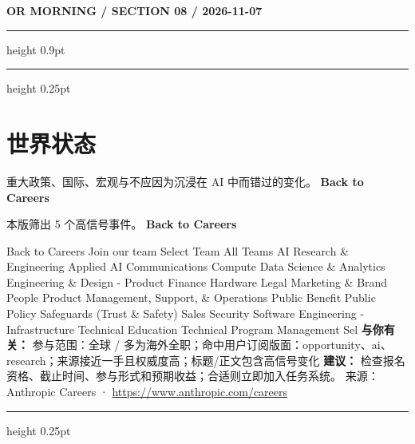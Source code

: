 \documentclass[10.5pt]{ctexart}
\begin{document}
\newpage
{\small\bfseries OR MORNING / SECTION 08 / 2026-11-07}
\vspace{2mm}
\hrule height 0.9pt
\vspace{1.5mm}
\hrule height 0.25pt
\vspace{4mm}
\section*{世界状态}
{\color{ormuted} 重大政策、国际、宏观与不应因为沉浸在 AI 中而错过的变化。}
\vspace{2mm}
{\LARGE\bfseries Back to Careers}\par
\vspace{1mm}
{\color{ormuted} 本版筛出 5 个高信号事件。}
\vspace{3mm}
{\Large\bfseries Back to Careers}\par
Back to Careers Join our team Select Team All Teams AI Research \& Engineering Applied AI Communications Compute Data Science \& Analytics Engineering \& Design - Product Finance Hardware Legal Marketing \& Brand People Product Management, Support, \& Operations Public Benefit Public Policy Safeguards (Trust \& Safety) Sales Security Software Engineering - Infrastructure Technical Education Technical Program Management Sel
\textbf{与你有关：} 参与范围：全球 / 多为海外全职；命中用户订阅版面：opportunity、ai、research；来源接近一手且权威度高；标题/正文包含高信号变化
\textbf{建议：} 检查报名资格、截止时间、参与形式和预期收益；合适则立即加入任务系统。
{\footnotesize\color{ormuted} 来源：Anthropic Careers · \url{https://www.anthropic.com/careers}}
\vspace{4mm}
\hrule height 0.25pt
\vspace{3mm}
\end{document}
